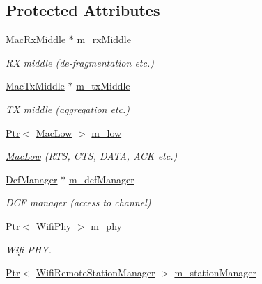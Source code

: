 \subsection*{Protected Attributes}
\begin{DoxyCompactItemize}
\item 
\hyperlink{classns3_1_1MacRxMiddle}{Mac\+Rx\+Middle} $\ast$ \hyperlink{classns3_1_1RegularWifiMac_a053ee6c09ab4809655bdeb82531c8c13}{m\+\_\+rx\+Middle}
\begin{DoxyCompactList}\small\item\em RX middle (de-\/fragmentation etc.) \end{DoxyCompactList}\item 
\hyperlink{classns3_1_1MacTxMiddle}{Mac\+Tx\+Middle} $\ast$ \hyperlink{classns3_1_1RegularWifiMac_afe94bc7a577c1b76234d6ae23bad0d1c}{m\+\_\+tx\+Middle}
\begin{DoxyCompactList}\small\item\em TX middle (aggregation etc.) \end{DoxyCompactList}\item 
\hyperlink{classns3_1_1Ptr}{Ptr}$<$ \hyperlink{classns3_1_1MacLow}{Mac\+Low} $>$ \hyperlink{classns3_1_1RegularWifiMac_a726ce0ade9bb7e6b7d81cd397f32dbde}{m\+\_\+low}
\begin{DoxyCompactList}\small\item\em \hyperlink{classns3_1_1MacLow}{Mac\+Low} (R\+TS, C\+TS, D\+A\+TA, A\+CK etc.) \end{DoxyCompactList}\item 
\hyperlink{classns3_1_1DcfManager}{Dcf\+Manager} $\ast$ \hyperlink{classns3_1_1RegularWifiMac_affcfccaae7c9ff15df0ad6752df95a16}{m\+\_\+dcf\+Manager}
\begin{DoxyCompactList}\small\item\em D\+CF manager (access to channel) \end{DoxyCompactList}\item 
\hyperlink{classns3_1_1Ptr}{Ptr}$<$ \hyperlink{classns3_1_1WifiPhy}{Wifi\+Phy} $>$ \hyperlink{classns3_1_1RegularWifiMac_a1a6dad8eb0a057a4e1b459f518457a4c}{m\+\_\+phy}
\begin{DoxyCompactList}\small\item\em Wifi P\+HY. \end{DoxyCompactList}\item 
\hyperlink{classns3_1_1Ptr}{Ptr}$<$ \hyperlink{classns3_1_1WifiRemoteStationManager}{Wifi\+Remote\+Station\+Manager} $>$ \hyperlink{classns3_1_1RegularWifiMac_a76d1a5e27b64bfe36f24a55d1eea2775}{m\+\_\+station\+Manager}

\end{DoxyCompactItemize}

